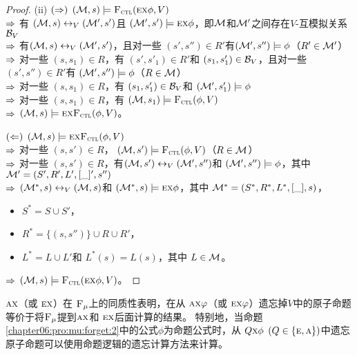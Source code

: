 \begin{proof}
	(ii) $(\Rightarrow)$ $({\cal M},s)\models{\textsc{F}_{\textsc{ctl}}}(\textsc{e}\textsc{x}\phi,V)$\\
	$\Rightarrow$ 有 $({\cal M},s)\leftrightarrow_V({\cal M}',s')$且 $({\cal M}',s')\models \textsc{e}\textsc{x}\phi$，即${\cal M}$和${\cal M}'$之间存在$V$-互模拟关系${\cal B}_V$\\
	$\Rightarrow$ 有$({\cal M},s)\leftrightarrow_V({\cal M}',s')$，且对一些 $(s',s'')\in R'$有$({\cal M}',s'')\models \phi$（$R'\in{\cal M}'$）\\
	$\Rightarrow$ 对一些 $(s,s_1)\in R$，有 $(s',s'_1)\in R'$和 $(s_1, s_1') \in {\cal B}_V$，且对一些$(s',s'')\in R'$有
	$({\cal M}',s'')\models \phi$（$R\in {\cal M}$）\\
	$\Rightarrow$ 对一些 $(s,s_1)\in R$，有 $(s_1, s_1') \in {\cal B}_V$和 $({\cal M}',s'_1)\models\phi$\\
	$\Rightarrow$ 对一些 $(s,s_1)\in R$，有 $({\cal M},s_1)\models{\textsc{F}_{\textsc{ctl}}}(\phi,V)$\\
	$\Rightarrow$ $({\cal M},s)\models\textsc{e}\textsc{x}{\textsc{F}_{\textsc{ctl}}}(\phi,V)$。
	
	$(\Leftarrow)$ $({\cal M},s)\models\textsc{e} \textsc{x}{\textsc{F}_{\textsc{ctl}}}(\phi,V)$\\
	$\Rightarrow$ 对一些 $(s,s')\in R$， $({\cal M},s')\models{\textsc{F}_{\textsc{ctl}}}(\phi,V)$（$R\in {\cal M}$）\\
	$\Rightarrow$ 对一些 $(s,s')\in R$，有$({\cal M},s')\leftrightarrow_V({\cal M}',s'')$和 $({\cal M}',s'')\models\phi$，其中 ${\cal M}'=(S',R',L',[\_]',s'')$ \\
	$\Rightarrow$ $({\cal M}^*,s)\leftrightarrow_V({\cal M},s)$和 $({\cal M}^*,s)\models\textsc{e}\textsc{x}\phi$，其中
	${\cal M}^*=(S^*,R^*,L^*,[\_], s)$，
	\begin{itemize}
		\item $S^*=S\cup S'$，
		\item $R^*=\{(s,s'')\}\cup R \cup R'$，
		\item $L^*= L \cup L'$和 $L^*(s)=L(s)$，其中 $L\in{\cal M}$。
	\end{itemize}
	$\Rightarrow$ $({\cal M},s)\models {\textsc{F}_{\textsc{ctl}}}(\textsc{e}\textsc{x}\phi,V)$。
	
\end{proof}


 $\textsc{a}\textsc{x}$（或 $\textsc{e}\textsc{x}$）在 ${\textsc{F}_{\textsc{$\mu$}}}$上的同质性表明，在从 $\textsc{a}\textsc{x} \varphi$（或 $\textsc{e}\textsc{x} \varphi$）遗忘掉$V$中的原子命题等价于将${\textsc{F}_{\textsc{$\mu$}}}$提到$\textsc{a}\textsc{x}$和 $\textsc{e} \textsc{x}$后面计算的结果。
特别地，当命题\ref{chapter06:pro:mu:forget:2}中的公式$\phi$为命题公式时，从
$Q\textsc{x} \phi$ $(Q\in \{\textsc{e}, \textsc{a}\})$中遗忘原子命题可以使用命题逻辑的遗忘计算方法来计算。

